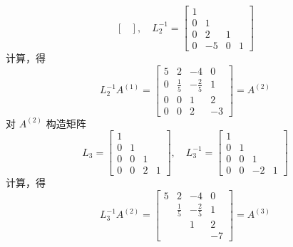 \begin{solution}
\begin{enumerate}
\begin{equation*}
\begin{bmatrix}
                            \end{bmatrix}, \quad L_2^{-1} = \begin{bmatrix}
                                1 & & & \\ 0 & 1 & & \\ 0 & 2 & 1 & \\ 0 & -5 & 0 & 1
                            \end{bmatrix}
                        \end{equation*}
                        计算，得 
                        \begin{equation*}
                            L_2^{-1}A^{(1)} = \begin{bmatrix}
                                5 & 2 & -4 & 0 \\ 0 & \frac{1}{5} & - \frac{2}{5} & 1 \\ 0 & 0 & 1 & 2 \\ 0 & 0 & 2 & -3
                            \end{bmatrix} = A^{(2)}
                        \end{equation*}
                        对 $A^{(2)}$ 构造矩阵 
                        \begin{equation*}
                            L_3 = \begin{bmatrix}
                                1 & & & \\ 0 & 1 & & \\ 0 & 0 & 1 & \\ 0 & 0 & 2 & 1
                            \end{bmatrix}, \quad L_3^{-1} = \begin{bmatrix}
                                1 & & & \\ 0 & 1 & & \\ 0 & 0 & 1 & \\ 0 & 0 & -2 & 1
                            \end{bmatrix}
                        \end{equation*}
                        计算，得 
                        \begin{equation*}
                            L_3^{-1}A^{(2)} = \begin{bmatrix}
                                5 & 2 & -4 & 0 \\ & \frac{1}{5} & -\frac{2}{5} & 1 \\ & & 1 & 2 \\ & & & -7
                            \end{bmatrix} = A^{(3)}

\end{equation*}
\end{enumerate}
\end{solution}
